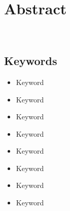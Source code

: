 \chapter*{Abstract}\label{ch:abstract-en}

\lipsum[1-2] \\

\section*{Keywords}\label{sec:keywords-en}
\begin{multicols}{2}
    \begin{itemize}
        \item Keyword
        \item Keyword
        \item Keyword
        \item Keyword
    \end{itemize}
    \columnbreak
    \begin{itemize}
        \item Keyword
        \item Keyword
        \item Keyword
        \item Keyword
    \end{itemize}
\end{multicols}
